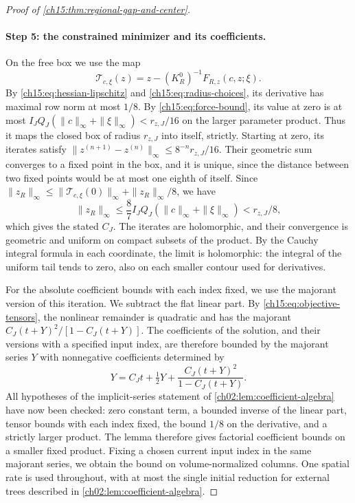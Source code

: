 \begin{proof}[Proof of \cref{ch15:thm:regional-gap-and-center}]
\paragraph{Step 5: the constrained minimizer and its coefficients.}
On the free box we use the map
\[
 \mathcal T_{c,\xi}(z)=z-(K_R^0)^{-1}F_{R,z}(c,z;\xi).
\]
By \eqref{ch15:eq:hessian-lipschitz} and \eqref{ch15:eq:radius-choices}, its derivative has maximal row norm at most $1/8$. By \eqref{ch15:eq:force-bound}, its value at zero is at most $I_JQ_J(\|c\|_\infty+\|\xi\|_\infty)<r_{z,J}/16$ on the larger parameter product. Thus it maps the closed box of radius $r_{z,J}$ into itself, strictly. Starting at zero, its iterates satisfy $\|z^{(n+1)}-z^{(n)}\|_\infty\le8^{-n}r_{z,J}/16$. Their geometric sum converges to a fixed point in the box, and it is unique, since the distance between two fixed points would be at most one eighth of itself. Since $\|z_R\|_\infty\le\|\mathcal T_{c,\xi}(0)\|_\infty+\|z_R\|_\infty/8$, we have
\[
 \|z_R\|_\infty\le\frac87 I_JQ_J
           (\|c\|_\infty+\|\xi\|_\infty)<r_{z,J}/8 ,
\]
which gives the stated $C_J$. The iterates are holomorphic, and their convergence is geometric and uniform on compact subsets of the product. By the Cauchy integral formula in each coordinate, the limit is holomorphic: the integral of the uniform tail tends to zero, also on each smaller contour used for derivatives.

For the absolute coefficient bounds with each index fixed, we use the majorant version of this iteration. We subtract the flat linear part. By \eqref{ch15:eq:objective-tensors}, the nonlinear remainder is quadratic and has the majorant $C_J(t+Y)^2/[1-C_J(t+Y)]$. The coefficients of the solution, and their versions with a specified input index, are therefore bounded by the majorant series $Y$ with nonnegative coefficients determined by
\begin{equation}\label{ch15:eq:center-majorant}
 Y=C_Jt+\tfrac12Y+\frac{C_J(t+Y)^2}{1-C_J(t+Y)} .
\end{equation}
All hypotheses of the implicit-series statement of \cref{ch02:lem:coefficient-algebra} have now been checked: zero constant term, a bounded inverse of the linear part, tensor bounds with each index fixed, the bound $1/8$ on the derivative, and a strictly larger product. The lemma therefore gives factorial coefficient bounds on a smaller fixed product. Fixing a chosen current input index in the same majorant series, we obtain the bound on volume-normalized columns. One spatial rate is used throughout, with at most the single initial reduction for external trees described in \cref{ch02:lem:coefficient-algebra}.


\end{proof}

